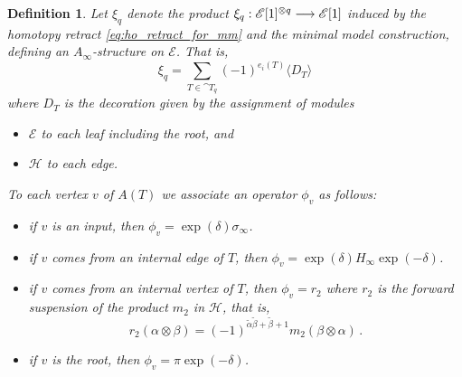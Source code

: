 \documentclass[english,letter paper,12pt,leqno]{article}
\theoremstyle{example}
\newtheorem{definition}[theorem]{Definition}
\numberwithin{equation}{section}
\def\be{\begin{equation}}
\def\ee{\end{equation}}
\begin{document}
\begin{definition} Let $\xi_q$ denote the product $\xi_q: \mathscr{E}[1]^{\otimes q} \longrightarrow \mathscr{E}[1]$ induced by the homotopy retract \eqref{eq:ho_retract_for_mm} and the minimal model construction, defining an $A_\infty$-structure on $\mathscr{E}$. That is,
\[
\xi_q = \sum_{T \in \cat{T}_q} (-1)^{e_i(T)} \langle D_T \rangle
\]
where $D_T$ is the decoration given by the assignment of modules
\begin{itemize}
\item $\mathscr{E}$ to each leaf including the root, and
\item $\mathscr{H}$ to each edge.
\end{itemize}
To each vertex $v$ of $A(T)$ we associate an operator $\phi_v$ as follows:
\begin{itemize}
\item if $v$ is an input, then $\phi_v = \exp(\delta)\sigma_\infty$.
\item if $v$ comes from an internal edge of $T$, then $\phi_v = \exp(\delta)H_\infty\exp(-\delta)$.
\item if $v$ comes from an internal vertex of $T$, then $\phi_v = r_2$ where $r_2$ is the forward suspension of the product $m_2$ in $\mathscr{H}$, that is,
\be\label{eq:r2vsm2}
r_2( \alpha \otimes \beta ) = (-1)^{\widetilde{\alpha}\widetilde{\beta} + \widetilde{\beta} + 1} m_2( \beta \otimes \alpha )\,.
\ee
\item if $v$ is the root, then $\phi_v = \pi \exp(-\delta)$.
\end{itemize}
\end{definition}
\end{document}
